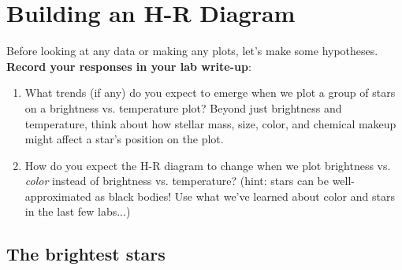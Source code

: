 \documentclass[11pt]{article}
\begin{document}
\section{Building an H-R Diagram}
Before looking at any data or making any plots, let's make some hypotheses. \textbf{Record your responses in your lab write-up}:
\begin{enumerate}
    \item What trends (if any) do you expect to emerge when we plot a group of stars on a brightness vs. temperature plot? Beyond just brightness and temperature, think about how stellar mass, size, color, and chemical makeup might affect a star's position on the plot.
    
    \item How do you expect the H-R diagram to change when we plot brightness vs. \emph{color} instead of brightness vs. temperature? (hint: stars can be well-approximated as black bodies! Use what we've learned about color and stars in the last few labs...) 
    
\end{enumerate}

\subsection{The brightest stars}
\end{document}
